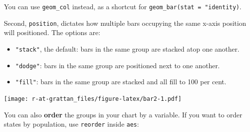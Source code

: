 \documentclass[]{book}
\newenvironment{Shaded}{\begin{snugshade}}{\end{snugshade}}
\newcommand{\DataTypeTok}[1]{\textcolor[rgb]{0.13,0.29,0.53}{#1}}
\newcommand{\DecValTok}[1]{\textcolor[rgb]{0.00,0.00,0.81}{#1}}
\newcommand{\KeywordTok}[1]{\textcolor[rgb]{0.13,0.29,0.53}{\textbf{#1}}}
\newcommand{\NormalTok}[1]{#1}
\newcommand{\OperatorTok}[1]{\textcolor[rgb]{0.81,0.36,0.00}{\textbf{#1}}}
\newcommand{\StringTok}[1]{\textcolor[rgb]{0.31,0.60,0.02}{#1}}
\providecommand{\tightlist}{%
  \setlength{\itemsep}{0pt}\setlength{\parskip}{0pt}}
\begin{document}
You can use \texttt{geom\_col} instead, as a shortcut for \texttt{geom\_bar(stat\ =\ "identity)}.

Second, \texttt{position}, dictates how multiple bars occupying the same x-axis position will positioned. The options are:

\begin{itemize}
\tightlist
\item
  \texttt{"stack"}, the default: bars in the same group are stacked atop one another.
\item
  \texttt{"dodge"}: bars in the same group are positioned next to one another.
\item
  \texttt{"fill"}: bars in the same group are stacked and all fill to 100 per cent.
\end{itemize}

\begin{Shaded}
\end{Shaded}

\texttt{[image: r-at-grattan\_files/figure-latex/bar2-1.pdf]}

You can also \textbf{order} the groups in your chart by a variable. If you want to order states by population, use \texttt{reorder} inside \texttt{aes}:
\end{document}
